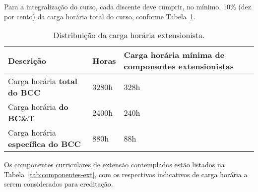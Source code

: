 Para a integralização do curso, cada discente deve cumprir, no mínimo,
10\% (dez por cento) da carga horária total do curso, conforme Tabela~\ref{tab:carga-ext}.

\begin{table}[h!]
  \caption{Distribuição da carga horária extensionista.}
  \label{tab:carga-ext}\centering
  \begin{tabular}{|p{}|p{}|p{}|}\hline
    Descrição & Horas & Carga horária mínima de componentes extensionistas\\\hline
    Carga horária \textbf{total do BCC} & 3280h & 328h\\\hline
    Carga horária \textbf{do BC\&T} & 2400h & 240h \\\hline
    Carga horária \textbf{específica do BCC} & 880h & 88h \\\hline
  \end{tabular}
\end{table}

Os componentes curriculares de extensão contemplados estão listados na
Tabela~\ref{tab:componentes-ext}, com os respectivos indicativos de carga horária a
serem considerados para creditação.

